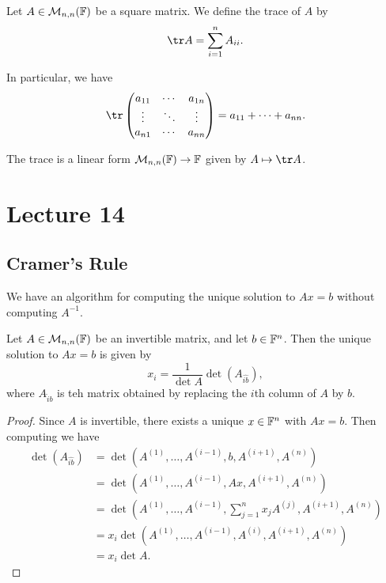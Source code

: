 \documentclass[a4paper]{scrartcl}
\begin{document}
\begin{definition}[Trace]
    Let $A \in \mathcal{M}_{n, n}(\mathbb{F})$ be a square matrix. We define the trace of $A$ by
    $$
    \tr A = \sum_{i = 1}^n A_{ii}.
    $$
\end{definition}

In particular, we have
$$
\tr \begin{pmatrix}
    a_{11} & \cdots & a_{1n} \\
    \vdots & \ddots & \vdots \\
    a_{n1} & \cdots & a_{nn}
\end{pmatrix} = a_{11} + \cdots + a_{nn}.
$$

\begin{remark}
    The trace is a linear form $\mathcal{M}_{n,n}(\mathbb{F}) \rightarrow \mathbb{F}$ given by $A \mapsto \tr A$.
\end{remark}

\begin{lemma}
    
\end{lemma}

\section{Lecture 14}

\subsection{Cramer's Rule}

We have an algorithm for computing the unique solution to $Ax = b$ without computing $A^{-1}$.

\begin{proposition}
    Let $A \in \mathcal{M}_{n , n}(\mathbb{F})$ be an invertible matrix, and let $b \in \mathbb{F}^n$. Then the unique solution to $Ax = b$ is given by
    $$
    x_i = \frac{1}{\det A} \det(A_{\hat{ib}}),
    $$
    where $A_{\hat{i}b}$ is teh matrix obtained by replacing the $i$th column of $A$ by $b$.
\end{proposition}
\begin{proof}
    Since $A$ is invertible, there exists a unique $x \in \mathbb{F}^n$ with $Ax = b$. Then
    computing we have
    \begin{align*}
        \det(A_{\hat{ib}}) &= \det(A^{(1)}, \dots, A^{(i - 1)}, b, A^{(i + 1)}, A^{(n)}) \\
        &= \det(A^{(1)}, \dots, A^{(i - 1)}, Ax, A^{(i + 1)}, A^{(n)}) \\
        &= \det(A^{(1)}, \dots, A^{(i - 1)}, \sum_{j = 1}^n x_j A^{(j)}, A^{(i + 1)}, A^{(n)}) \\
        &= x_i \det(A^{(1)}, \dots, A^{(i - 1)}, A^{(i)}, A^{(i + 1)}, A^{(n)})  \\
        &= x_i \det A.
    \end{align*}
\end{proof}
\end{document}
